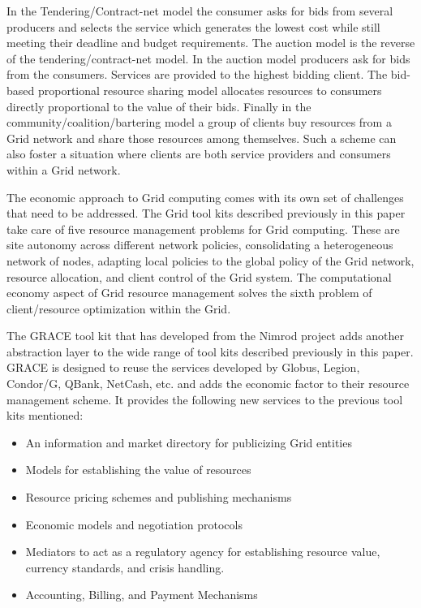 \documentclass[conference]{IEEEtran}
\begin{document}
In the Tendering/Contract-net model the consumer asks for bids from several producers and selects the service which generates the lowest cost while still meeting their deadline and budget requirements. The auction model is the reverse of the tendering/contract-net model. In the auction model producers ask for bids from the consumers. Services are provided to the highest bidding client. The bid-based proportional resource sharing model allocates resources to consumers directly proportional to the value of their bids. Finally in the community/coalition/bartering model a group of clients buy resources from a Grid network and share those resources among themselves. Such a scheme can also foster a situation where clients are both service providers and consumers within a Grid network. 

The economic approach to Grid computing comes with its own set of challenges that need to be addressed. The Grid tool kits described previously in this paper take care of five resource management problems for Grid computing. These are site autonomy across different network policies, consolidating a heterogeneous network of nodes, adapting local policies to the global policy of the Grid network, resource allocation, and client control of the Grid system. The computational economy aspect of Grid resource management solves the sixth problem of client/resource optimization within the Grid. 

The GRACE tool kit that has developed from the Nimrod project adds another abstraction layer to the wide range of tool kits described previously in this paper. GRACE is designed to reuse the services developed by Globus, Legion, Condor/G, QBank, NetCash, etc. and adds the economic factor to their resource management scheme. \cite{grace} It provides the following new services to the previous tool kits mentioned:

\begin{itemize}
\item An information and market directory for publicizing Grid entities
\item Models for establishing the value of resources
\item Resource pricing schemes and publishing mechanisms
\item Economic models and negotiation protocols
\item Mediators to act as a regulatory agency for establishing resource value, currency standards, and crisis handling.
\item Accounting, Billing, and Payment Mechanisms
\end{itemize}
\end{document}

